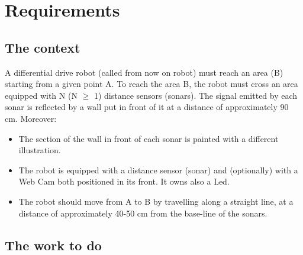 \documentclass[a4paper]{article}
\begin{document}
\section{Requirements }

\subsection {The context}

A differential drive robot (called from now on robot) must reach an area (B) starting from a given point A. To reach the area B, the robot must cross an area equipped with N (N $\geq$ 1) distance sensors (sonars). The signal emitted by each sonar is reflected by a wall put in front of it at a distance of approximately 90 cm.
Moreover:
\begin{itemize}
	\item The section of the wall in front of each sonar is painted with a different illustration.
	\item The robot is equipped with a distance sensor (sonar) and (optionally) with a Web Cam both positioned in its front. It owns also a Led.
	\item The robot should move from A to B by travelling along a straight line, at a distance of approximately 40-50 cm from the base-line of the sonars.
\end{itemize}


\subsection {The work to do}
\end{document}
